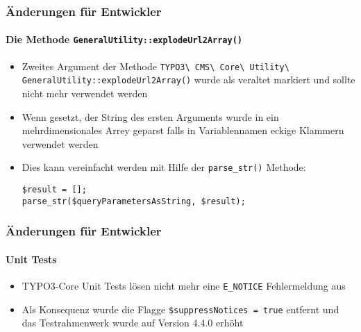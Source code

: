 \begin{frame}[fragile]
	\frametitle{Änderungen für Entwickler}
	\framesubtitle{Die Methode \texttt{GeneralUtility::explodeUrl2Array()}}

	\begin{itemize}
		\item Zweites Argument der Methode
			\smaller
				\texttt{TYPO3\textbackslash
					CMS\textbackslash
					Core\textbackslash
					Utility\textbackslash
					GeneralUtility::explodeUrl2Array()}\newline
			\normalsize
			wurde als veraltet markiert und sollte nicht mehr verwendet werden

		\item Wenn gesetzt, der String des ersten Arguments wurde in ein mehrdimensionales Arrey geparst
			falls in Variablennamen eckige Klammern verwendet werden
		\item Dies kann vereinfacht werden mit Hilfe der \texttt{parse\_str()}
			Methode:

			\begin{lstlisting}
$result = [];
parse_str($queryParametersAsString, $result);
			\end{lstlisting}

	\end{itemize}

\end{frame}


\begin{frame}[fragile]
	\frametitle{Änderungen für Entwickler}
	\framesubtitle{Unit Tests}

	\begin{itemize}
		\item TYPO3-Core Unit Tests lösen nicht mehr eine \texttt{E\_NOTICE} Fehlermeldung aus
		\item Als Konsequenz wurde die Flagge \texttt{\$suppressNotices = true} entfernt und 
			das Testrahmenwerk wurde auf Version 4.4.0 erhöht

	\end{itemize}

\end{frame}

